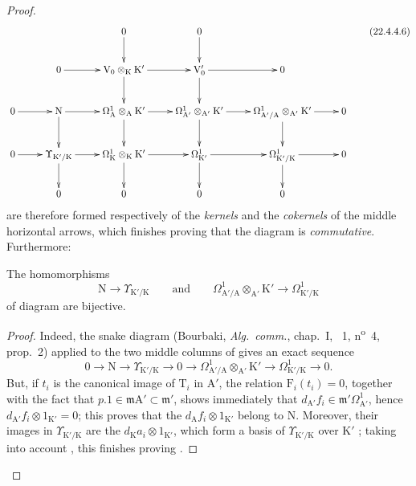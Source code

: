 \begin{proof}

\begin{equation}
\label{0.22.4.4.6}
  \xymatrix{
    && 0 \ar[d] & 0 \ar[d] && \\
    & 0 \ar[r] & \mathrm{V}_0\otimes_\mathrm{K}\mathrm{K}' \ar[r] \ar[d] & \mathrm{V}_0' \ar[r] \ar[d] & 0 & \\
    0 \ar[r] & \mathrm{N} \ar[r] \ar[d] & \Omega^1_\mathrm{A}\otimes_\mathrm{A}\mathrm{K}' \ar[r] \ar[d] &
      \Omega^1_{\mathrm{A}'}\otimes_{\mathrm{A}'}\mathrm{K}' \ar[r] \ar[d] &
      \Omega^1_{\mathrm{A}'/\mathrm{A}}\otimes_{\mathrm{A}'}\mathrm{K}' \ar[r] \ar[d] & 0 \\
    0 \ar[r] & \Upsilon_{\mathrm{K}'/\mathrm{K}} \ar[r] \ar[d] &
      \Omega^1_\mathrm{K}\otimes_\mathrm{K}\mathrm{K}' \ar[r] \ar[d] & \Omega^1_{\mathrm{K}'} \ar[r] \ar[d] &
      \Omega^1_{\mathrm{K}'/\mathrm{K}} \ar[r] \ar[d] & 0 \\
    & 0 & 0 & 0 & 0 &
  }
  \tag{22.4.4.6}
\end{equation}
are therefore formed respectively of the \emph{kernels} and the \emph{cokernels} of the middle horizontal arrows, which finishes proving that the diagram is \emph{commutative}.
Furthermore:

\begin{lemma}[22.4.4.7]
\label{0.22.4.4.7}
The homomorphisms
\[
  \mathrm{N}\longrightarrow\Upsilon_{\mathrm{K}'/\mathrm{K}}\qquad\text{and}\qquad
  \Omega^1_{\mathrm{A}'/\mathrm{A}}\otimes_{\mathrm{A}'}\mathrm{K}'
  \longrightarrow\Omega^1_{\mathrm{K}'/\mathrm{K}}
\]
of diagram  are bijective.
\end{lemma}

\begin{proof}
Indeed, the snake diagram (Bourbaki, \emph{Alg.~comm.}, chap.~I, \textsection~1, n\textsuperscript{o}~4, prop.~2) applied to the two middle columns of  gives an exact sequence
\[
  0\longrightarrow\mathrm{N}\longrightarrow\Upsilon_{\mathrm{K}'/\mathrm{K}}\longrightarrow0
  \longrightarrow\Omega^1_{\mathrm{A}'/\mathrm{A}}\otimes_{\mathrm{A}'}\mathrm{K}'
  \longrightarrow\Omega^1_{\mathrm{K}'/\mathrm{K}}\longrightarrow0.
\]
But, if $t_i$ is the canonical image of $\mathrm{T}_i$ in $\mathrm{A}'$, the relation $\mathrm{F}_i(t_i)=0$, together with the fact that $p.1\in\mathfrak{m}\mathrm{A}'\subset\mathfrak{m}'$, shows immediately that $d_{\mathrm{A}'}f_i\in\mathfrak{m}'\Omega^1_{\mathrm{A}'}$, hence $d_{\mathrm{A}'}f_i\otimes 1_{\mathrm{K}'}=0$;
this proves that the $d_\mathrm{A}f_i\otimes 1_{\mathrm{K}'}$ belong to $\mathrm{N}$.
Moreover, their images in $\Upsilon_{\mathrm{K}'/\mathrm{K}}$ are the $d_\mathrm{K}a_i\otimes 1_{\mathrm{K}'}$, which form a basis of $\Upsilon_{\mathrm{K}'/\mathrm{K}}$ over $\mathrm{K}'$ ; taking into account , this finishes proving .
\end{proof}
\end{proof}

